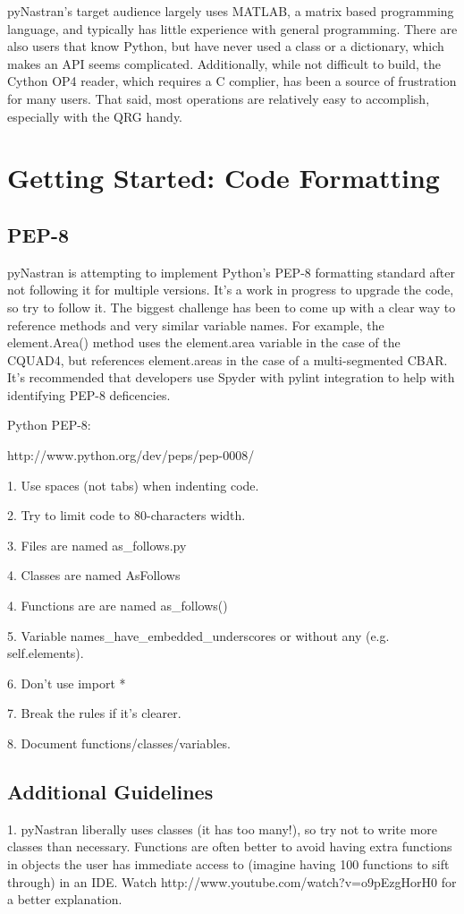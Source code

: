      pyNastran's target audience largely uses MATLAB, a matrix based programming language, and typically has little experience with general programming.  There are also users that know Python, but have never used a class or a dictionary, which makes an API seems complicated.  Additionally, while not difficult to build, the Cython OP4 reader, which requires a C complier, has been a source of frustration for many users.  That said, most operations are relatively easy to accomplish, especially with the QRG handy.


\section{Getting Started: Code Formatting}
 \subsection{PEP-8}
     pyNastran is attempting to implement Python's PEP-8 formatting standard after not following it for multiple versions.  It's a work in progress to upgrade the code, so try to follow it.  The biggest challenge has been to come up with a clear way to reference methods and very similar variable names.  For example, the element.Area() method uses the element.area variable in the case of the CQUAD4, but references element.areas in the case of a multi-segmented CBAR.  It's recommended that developers use Spyder with pylint integration to help with identifying PEP-8 deficencies.

    Python PEP-8:
     
     http://www.python.org/dev/peps/pep-0008/

     1.  Use spaces (not tabs) when indenting code.

     2.  Try to limit code to 80-characters width.

     3.  Files are named as\_follows.py

     4.  Classes are named AsFollows

     4.  Functions are are named as\_follows()

     5.  Variable names\_have\_embedded\_underscores or without any (e.g. self.elements).

     6.  Don't use import *

     7.  Break the rules if it's clearer.

     8.  Document functions/classes/variables.

 \subsection{Additional Guidelines}
     1.  pyNastran liberally uses classes (it has too many!), so try not to write more classes than necessary.  Functions are often better to avoid having extra functions in objects the user has immediate access to (imagine having 100 functions to sift through) in an IDE.  Watch http://www.youtube.com/watch?v=o9pEzgHorH0 for a better explanation.


